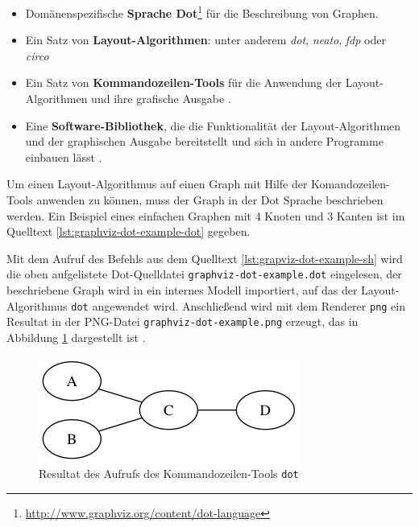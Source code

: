 \begin{itemize}
    \item Domänenspezifische \textbf{Sprache Dot}\footnote{\url{http://www.graphviz.org/content/dot-language}} für die Beschreibung von Graphen.
    \item Ein Satz von \textbf{Layout-Algorithmen}: unter anderem \textit{dot}, \textit{neato}, \textit{fdp} oder \textit{circo} \cite{Gansner14Using, NorthGansner14Dot-Manual}
    \item Ein Satz von \textbf{Kommandozeilen-Tools} für die Anwendung der Layout-Algorithmen und ihre grafische Ausgabe \cite{NorthGansner14Dot-Manual}.
    \item Eine \textbf{Software-Bibliothek}, die die Funktionalität der Layout-Algorithmen und der graphischen Ausgabe bereitstellt und sich in andere Programme einbauen lässt \cite{Gansner14Using}.
\end{itemize}

Um einen Layout-Algorithmus auf einen Graph mit Hilfe der Komandozeilen-Tools anwenden zu können, muss der Graph in der Dot Sprache beschrieben werden. Ein Beispiel eines einfachen Graphen mit 4 Knoten und 3 Kanten ist im Quelltext \ref{lst:graphviz-dot-example-dot} gegeben.



Mit dem Aufruf des Befehls aus dem Quelltext \ref{lst:grapviz-dot-example-sh} wird die oben aufgelistete Dot-Quelldatei \lstinline{graphviz-dot-example.dot} eingelesen, der beschriebene Graph wird in ein internes Modell importiert, auf das der Layout-Algorithmus \lstinline{dot} angewendet wird. Anschließend wird mit dem Renderer \lstinline{png} ein Resultat in der PNG-Datei \lstinline{graphviz-dot-example.png} erzeugt, das in Abbildung \ref{fig:graphviz-dot-example} dargestellt ist \cite{Gansner14Using}.



\begin{figure}[hbt]
    \centering
    \includegraphics[scale=0.75]{resources/graphviz-dot-example.png}
    \caption{Resultat des Aufrufs des Kommandozeilen-Tools \lstinline{dot}}
    \label{fig:graphviz-dot-example}
\end{figure}

